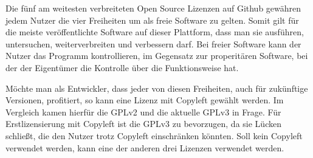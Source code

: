 
Die fünf am weitesten verbreiteten Open Source Lizenzen auf Github gew\"ahren jedem Nutzer die vier Freiheiten um als freie Software zu gelten. Somit gilt f\"ur die meiste ver\"offentlichte Software auf dieser Plattform, dass man sie ausf\"uhren, untersuchen, weiterverbreiten und verbessern darf. Bei freier Software kann der Nutzer das Programm kontrollieren, im Gegensatz zur properit\"aren Software, bei der der Eigentümer die Kontrolle \"uber die Funktionsweise hat. 

Möchte man als Entwickler, dass jeder von diesen Freiheiten, auch f\"ur zuk\"unftige Versionen, profitiert, so kann eine Lizenz mit Copyleft gew\"ahlt werden. Im Vergleich kamen hierf\"ur die GPLv2 und die aktuelle GPLv3 in Frage. F\"ur Erstlizensierung mit Copyleft ist die GPLv3 zu bevorzugen, da sie L\"ucken schließt, die den Nutzer trotz Copyleft einschr\"anken k\"onnten. Soll kein Copyleft verwendet werden, kann eine der anderen drei Lizenzen verwendet werden.